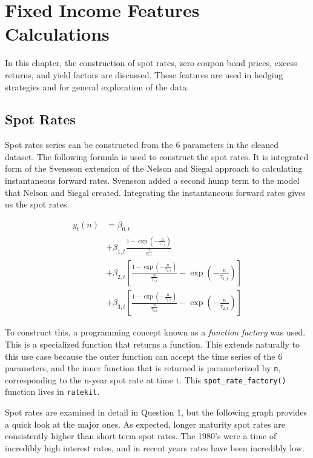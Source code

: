 \documentclass[openany]{book}
\theoremstyle{definition}
\theoremstyle{definition}
\theoremstyle{definition}
\theoremstyle{remark}
\begin{document}
\small

\normalsize

\hypertarget{rates}{%
\chapter{Fixed Income Features Calculations}\label{rates}}

In this chapter, the construction of spot rates, zero coupon bond
prices, excess returns, and yield factors are discussed. These features
are used in hedging strategies and for general exploration of the data.

\small

\normalsize

\hypertarget{spot-rates}{%
\section{Spot Rates}\label{spot-rates}}

Spot rates series can be constructed from the 6 parameters in the
cleaned dataset. The following formula is used to construct the spot
rates. It is integrated form of the Svensson extension of the Nelson and
Siegal approach to calculating instantaneous forward rates. Svensson
added a second hump term to the model that Nelson and Siegal created.
Integrating the instantaneous forward rates gives us the spot rates.

\[
\begin{aligned}
  y_t(n) &= \beta_{0,t} \\
   &+ \beta_{1,t} \frac{1 - \exp(- \frac{n}{\tau_{1,t}})}{\frac{n}{\tau_{1,t}}} \\
   &+ \beta_{2,t} [\frac{1 - \exp(- \frac{n}{\tau_{1,t}})}{\frac{n}{\tau_{1,t}}} - \exp(-\frac{n}{\tau_{1,t}})] \\
   &+ \beta_{3,t} [\frac{1 - \exp(- \frac{n}{\tau_{2,t}})}{\frac{n}{\tau_{2,t}}} - \exp(-\frac{n}{\tau_{2,t}})]
\end{aligned}
\]

To construct this, a programming concept known as a \emph{function
factory} was used. This is a specialized function that returns a
function. This extends naturally to this use case because the outer
function can accept the time series of the 6 parameters, and the inner
function that is returned is parameterized by \texttt{n}, corresponding
to the n-year spot rate at time t. This \texttt{spot\_rate\_factory()}
function lives in \texttt{ratekit}.

Spot rates are examined in detail in Question 1, but the following graph
provides a quick look at the major ones. As expected, longer maturity
spot rates are consistently higher than short term spot rates. The
1980's were a time of incredibly high interest rates, and in recent
years rates have been incredibly low.
\end{document}
